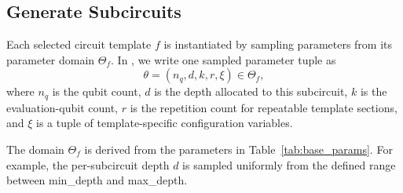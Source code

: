 \subsection{Generate Subcircuits }
\label{sssec:subc}
Each selected circuit template \(f\) is instantiated by sampling parameters from its
parameter domain \(\Theta_f\). In \sys, we write one sampled
parameter tuple as
\begin{equation}
\theta = (n_q, d, k, r, \xi) \in \Theta_f,
\end{equation}
where \(n_q\) is the qubit count, \(d\) is the depth  allocated to this subcircuit,
\(k\) is the evaluation-qubit count, \(r\) is the repetition count for repeatable template
sections, and \(\xi\) is a tuple of template-specific configuration variables.

 


The domain \(\Theta_f\) is derived from the  parameters  in Table~\ref{tab:base_params}. For example, the per-subcircuit depth \(d\) is sampled uniformly from the defined range between  min\_depth and max\_depth. 






